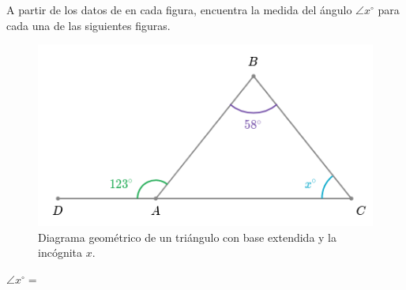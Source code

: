 A partir de los datos de en cada figura, encuentra la medida del \'angulo $\angle x^\circ$ para cada una de las siguientes figuras.

\begin{minipage}[b]{0.42\textwidth}
    \begin{figure}[H]
        \includegraphics[width=\linewidth]{Images/triangle_angle_01}
        \caption{Diagrama geométrico de un tri\'angulo con base extendida y la inc\'ognita $x$.}
        \label{fig:triangle_angle_01}
    \end{figure}
    \begin{center}
        {\color{cielo}\textbf{$\angle x^\circ =$}} \fbox{
            \begin{minipage}{2cm}
                \hfill\vspace{0.5cm}
            \end{minipage}
        }
    \end{center}
\end{minipage}
\hspace{1cm}
